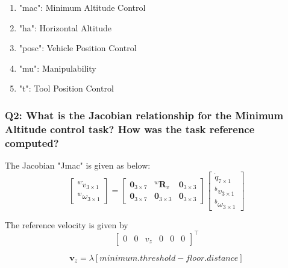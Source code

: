 \documentclass{article}
\begin{document}
\begin{enumerate}
	\item "mac": Minimum Altitude Control
	\item "ha": Horizontal Altitude
	\item "posc": Vehicle Position Control 
	\item "mu": Manipulability
	\item "t": Tool Position Control	
\end{enumerate}


\subsubsection{Q2: What is the Jacobian relationship for the Minimum Altitude control task? How was the task reference computed?}

The Jacobian "Jmac" is given as below:  
\begin{equation}
\left[\begin{array}{c}{^{w}\dot{v}_{3 \times 1}} \\ ^{w}{\omega}_{3 \times 1}\end{array}\right]=\left[\begin{array}{ccc}{\mathbf{0}_{3 \times 7}} & {^{w}\boldsymbol{R}_{v}}& {\mathbf{0}_{3 \times 3}} \\ {\mathbf{0}_{3 \times 7}} & {\mathbf{0}_{3 \times 3}} & {\mathbf{0}_{3 \times 3}}\end{array}\right]\left[\begin{array}{c}{\dot{q}_{7 \times 1}} \\ ^{b}{v}_{3 \times 1} \\ ^{b}{\omega}_{3 \times 1}\end{array}\right]
\end{equation}

The reference velocity is given by 
\begin{displaymath}
\begin{bmatrix} 0 & 0 & {v}_z & 0 & 0 & 0 \end{bmatrix}^\top
\end{displaymath}


\begin{equation}
{\boldsymbol{v}}_{z}=\lambda \left[ minimum.threshold - floor.distance \right]
\end{equation}
\end{document}
